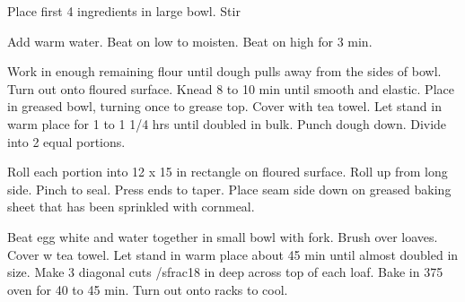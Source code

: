Place first 4 ingredients in large bowl.  Stir
 
Add warm water.  Beat on low to moisten.  Beat on high for 3 min.
 
Work in enough remaining flour until dough pulls away from the sides of bowl.  Turn out onto floured surface.  Knead 8 to 10 min until smooth and elastic.  Place in greased bowl, turning once to grease top.  Cover with tea towel.  Let stand in warm place for 1 to 1 1/4 hrs until doubled in bulk.  Punch dough down.  Divide into 2 equal portions.
 
Roll each portion into 12 x 15 in rectangle on floured surface.  Roll up from long side.  Pinch to seal.  Press ends to taper.  Place seam side down on greased baking sheet that has been sprinkled with cornmeal.
 
Beat egg white and water together in small bowl with fork.  Brush over loaves.  Cover w tea towel.  Let stand in warm place about 45 min until almost doubled in size.  Make 3 diagonal cuts /sfrac{1}{8}  in deep across top of each loaf.  Bake in  375 oven for 40 to 45 min.  Turn out onto racks to cool.
 